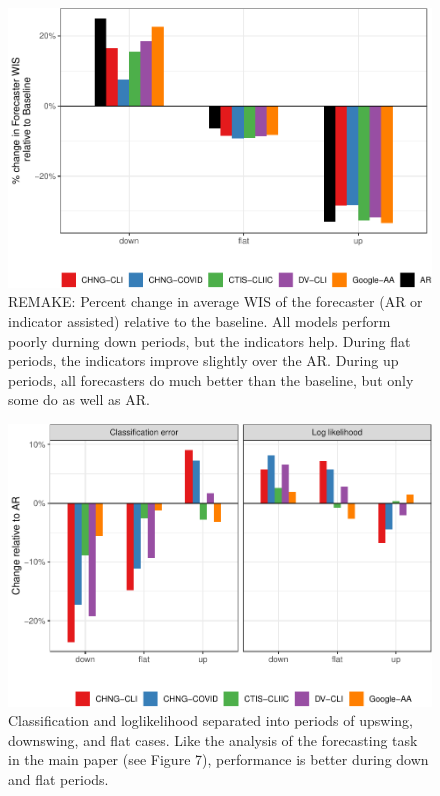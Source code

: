 \documentclass[9pt,twoside,lineno]{pnas-new}
\begin{document}
\begin{figure}

{\centering \includegraphics[width=\textwidth]{fig/upswing-summary-remake-1} 

}

\caption{REMAKE: Percent change in average WIS of the forecaster (AR or indicator assisted) relative to the baseline. All models perform poorly durning down periods, but the indicators help. During flat periods, the indicators improve slightly over the AR. During up periods, all forecasters do much better than the baseline, but only some do as well as AR.}\label{fig:upswing-summary-remake}
\end{figure}

\clearpage

\begin{figure}

{\centering \includegraphics[width=\textwidth]{fig/hotspots-upswing-downswing-1} 

}

\caption{Classification and loglikelihood separated into periods of upswing, downswing, and flat cases. Like the analysis of the forecasting task in the main paper (see Figure 7), performance is better during down and flat periods.}\label{fig:hotspots-upswing-downswing}
\end{figure}
\end{document}
